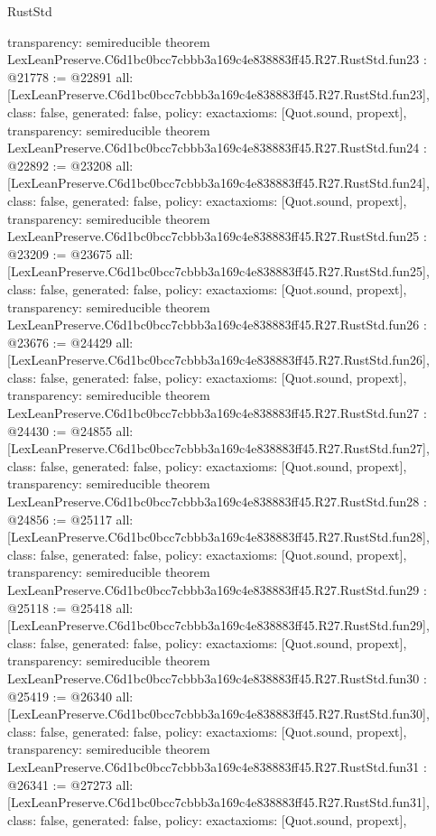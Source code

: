 \begin{lexlean}{RustStd}
\begin{coremodule}
{  transparency: semireducible
}
theorem LexLeanPreserve.C6d1bc0bcc7cbbb3a169c4e838883ff45.R27.RustStd.fun23 : @21778 := @22891 {
  all: [LexLeanPreserve.C6d1bc0bcc7cbbb3a169c4e838883ff45.R27.RustStd.fun23],
  class: false,
  generated: false,
  policy: exact{axioms: [Quot.sound, propext]},
  transparency: semireducible
}
theorem LexLeanPreserve.C6d1bc0bcc7cbbb3a169c4e838883ff45.R27.RustStd.fun24 : @22892 := @23208 {
  all: [LexLeanPreserve.C6d1bc0bcc7cbbb3a169c4e838883ff45.R27.RustStd.fun24],
  class: false,
  generated: false,
  policy: exact{axioms: [Quot.sound, propext]},
  transparency: semireducible
}
theorem LexLeanPreserve.C6d1bc0bcc7cbbb3a169c4e838883ff45.R27.RustStd.fun25 : @23209 := @23675 {
  all: [LexLeanPreserve.C6d1bc0bcc7cbbb3a169c4e838883ff45.R27.RustStd.fun25],
  class: false,
  generated: false,
  policy: exact{axioms: [Quot.sound, propext]},
  transparency: semireducible
}
theorem LexLeanPreserve.C6d1bc0bcc7cbbb3a169c4e838883ff45.R27.RustStd.fun26 : @23676 := @24429 {
  all: [LexLeanPreserve.C6d1bc0bcc7cbbb3a169c4e838883ff45.R27.RustStd.fun26],
  class: false,
  generated: false,
  policy: exact{axioms: [Quot.sound, propext]},
  transparency: semireducible
}
theorem LexLeanPreserve.C6d1bc0bcc7cbbb3a169c4e838883ff45.R27.RustStd.fun27 : @24430 := @24855 {
  all: [LexLeanPreserve.C6d1bc0bcc7cbbb3a169c4e838883ff45.R27.RustStd.fun27],
  class: false,
  generated: false,
  policy: exact{axioms: [Quot.sound, propext]},
  transparency: semireducible
}
theorem LexLeanPreserve.C6d1bc0bcc7cbbb3a169c4e838883ff45.R27.RustStd.fun28 : @24856 := @25117 {
  all: [LexLeanPreserve.C6d1bc0bcc7cbbb3a169c4e838883ff45.R27.RustStd.fun28],
  class: false,
  generated: false,
  policy: exact{axioms: [Quot.sound, propext]},
  transparency: semireducible
}
theorem LexLeanPreserve.C6d1bc0bcc7cbbb3a169c4e838883ff45.R27.RustStd.fun29 : @25118 := @25418 {
  all: [LexLeanPreserve.C6d1bc0bcc7cbbb3a169c4e838883ff45.R27.RustStd.fun29],
  class: false,
  generated: false,
  policy: exact{axioms: [Quot.sound, propext]},
  transparency: semireducible
}
theorem LexLeanPreserve.C6d1bc0bcc7cbbb3a169c4e838883ff45.R27.RustStd.fun30 : @25419 := @26340 {
  all: [LexLeanPreserve.C6d1bc0bcc7cbbb3a169c4e838883ff45.R27.RustStd.fun30],
  class: false,
  generated: false,
  policy: exact{axioms: [Quot.sound, propext]},
  transparency: semireducible
}
theorem LexLeanPreserve.C6d1bc0bcc7cbbb3a169c4e838883ff45.R27.RustStd.fun31 : @26341 := @27273 {
  all: [LexLeanPreserve.C6d1bc0bcc7cbbb3a169c4e838883ff45.R27.RustStd.fun31],
  class: false,
  generated: false,
  policy: exact{axioms: [Quot.sound, propext]},
}
\end{coremodule}
\end{lexlean}
